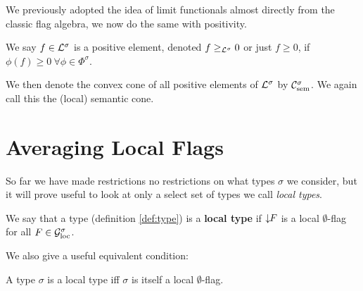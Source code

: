 We previously adopted the idea of limit functionals almost directly from the
classic flag algebra, we now do the same with positivity. 
\begin{definition}
    We say $f\in\mathcal{L}^\sigma$ is a positive element, denoted $f \geq_{\mathcal{L}^\sigma} 0$ or
    just $f\geq 0$, if $\phi(f) \geq 0\ \forall \phi\in\Phi^\sigma$.
\end{definition} 

We then denote the convex cone of all positive elements of $\mathcal{L}^\sigma$ by
$\mathcal{C}_\mathrm{sem}^\sigma$. We again call this the (local) semantic cone.

\section{Averaging Local Flags}

So far we have made restrictions no restrictions on what types $\sigma$ we consider, but
it will prove useful to look at only a select set of types we call \textit{local types}.
\begin{definition}
    \label{def:local_type}
    We say that a type (definition \ref{def:type}) is a \textbf{local type}
    if ${\downarrow\!\!F}$ is a local $\emptyset$-flag for all $F\in\mathcal{G}_\mathrm{loc}^\sigma$.
\end{definition}

We also give a useful equivalent condition:
\begin{lemma}
    \label{lemma:local_type_equiv}
    A type $\sigma$ is a local type iff $\sigma$ is itself a local $\emptyset$-flag.
\end{lemma}

